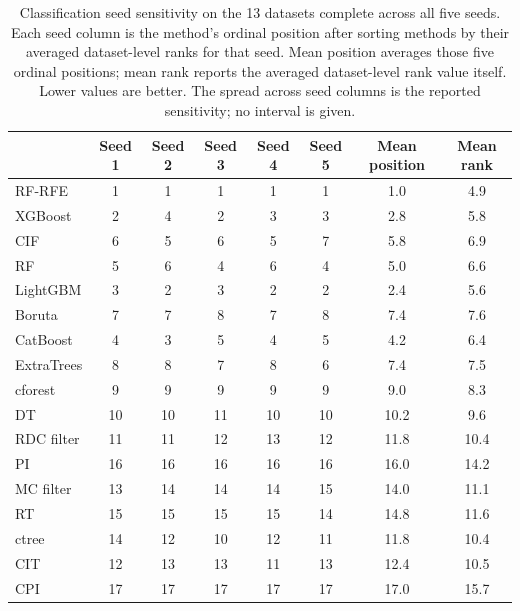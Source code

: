 \begin{table}[!htbp]
  \centering
  \footnotesize
  \setlength{\tabcolsep}{4pt}
  \renewcommand{\arraystretch}{1.04}
  \begin{tabular}{@{}l
    S[table-format=2.0]
    S[table-format=2.0]
    S[table-format=2.0]
    S[table-format=2.0]
    S[table-format=2.0]
    S[table-format=2.1]
    S[table-format=2.1]@{}}
    \toprule
     & {Seed 1} & {Seed 2} & {Seed 3} & {Seed 4} & {Seed 5} & {Mean position} & {Mean rank} \\
    \midrule
    RF-RFE & 1 & 1 & 1 & 1 & 1 & 1.0 & 4.9 \\
    XGBoost & 2 & 4 & 2 & 3 & 3 & 2.8 & 5.8 \\
    CIF & 6 & 5 & 6 & 5 & 7 & 5.8 & 6.9 \\
    RF & 5 & 6 & 4 & 6 & 4 & 5.0 & 6.6 \\
    LightGBM & 3 & 2 & 3 & 2 & 2 & 2.4 & 5.6 \\
    Boruta & 7 & 7 & 8 & 7 & 8 & 7.4 & 7.6 \\
    CatBoost & 4 & 3 & 5 & 4 & 5 & 4.2 & 6.4 \\
    ExtraTrees & 8 & 8 & 7 & 8 & 6 & 7.4 & 7.5 \\
    cforest & 9 & 9 & 9 & 9 & 9 & 9.0 & 8.3 \\
    DT & 10 & 10 & 11 & 10 & 10 & 10.2 & 9.6 \\
    RDC filter & 11 & 11 & 12 & 13 & 12 & 11.8 & 10.4 \\
    PI & 16 & 16 & 16 & 16 & 16 & 16.0 & 14.2 \\
    MC filter & 13 & 14 & 14 & 14 & 15 & 14.0 & 11.1 \\
    RT & 15 & 15 & 15 & 15 & 14 & 14.8 & 11.6 \\
    ctree & 14 & 12 & 10 & 12 & 11 & 11.8 & 10.4 \\
    CIT & 12 & 13 & 13 & 11 & 13 & 12.4 & 10.5 \\
    CPI & 17 & 17 & 17 & 17 & 17 & 17.0 & 15.7 \\
    \bottomrule
  \end{tabular}
  \caption{Classification seed sensitivity on the 13 datasets complete across
  all five seeds. Each seed column is the method's ordinal position after
  sorting methods by their averaged dataset-level ranks for that seed. Mean
  position averages those five ordinal positions; mean rank reports the averaged
  dataset-level rank value itself. Lower values are better. The spread across seed columns is the reported sensitivity; no interval is given.}
  \label{tab:classification-seed-sensitivity}
\end{table}

